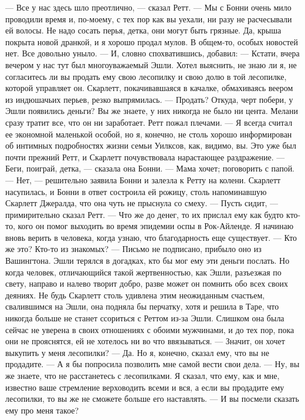 — Все у нас здесь шло преотлично, — сказал Ретт. — Мы с Бонни очень мило проводили время и, по-моему, с тех пор как вы уехали, ни разу не расчесывали ей волосы. Не надо сосать перья, детка, они могут быть грязные. Да, крыша покрыта новой дранкой, и я хорошо продал мулов. В общем-то, особых новостей нет. Все довольно уныло. — И, словно спохватившись, добавил: — Кстати, вчера вечером у нас тут был многоуважаемый Эшли. Хотел выяснить, не знаю ли я, не согласитесь ли вы продать ему свою лесопилку и свою долю в той лесопилке, которой управляет он.
Скарлетт, покачивавшаяся в качалке, обмахиваясь веером из индюшачьих перьев, резко выпрямилась.
— Продать? Откуда, черт побери, у Эшли появились деньги? Вы же знаете, у них никогда не было ни цента. Мелани сразу тратит все, что он ни заработает.
Ретт пожал плечами.
— Я всегда считал ее экономной маленькой особой, но я, конечно, не столь хорошо информирован об интимных подробностях жизни семьи Уилксов, как, видимо, вы.
Это уже был почти прежний Ретт, и Скарлетт почувствовала нарастающее раздражение.
— Беги, поиграй, детка, — сказала она Бонни. — Мама хочет; поговорить с папой.
— Нет, — решительно заявила Бонни и залезла к Ретту на колени.
Скарлетт насупилась, и Бонни в ответ состроила ей рожицу, столь напоминавшую Скарлетт Джералда, что она чуть не прыснула со смеху.
— Пусть сидит, — примирительно сказал Ретт. — Что же до денег, то их прислал ему как будто кто-то, кого он помог выходить во время эпидемии оспы в Рок-Айленде. Я начинаю вновь верить в человека, когда узнаю, что благодарность еще существует.
— Кто же это? Кто-то из знакомых?
— Письмо не подписано, прибыло оно из Вашингтона. Эшли терялся в догадках, кто бы мог ему эти деньги послать. Но когда человек, отличающийся такой жертвенностью, как Эшли, разъезжая по свету, направо и налево творит добро, разве может он помнить обо всех своих деяниях.
Не будь Скарлетт столь удивлена этим неожиданным счастьем, свалившимся на Эшли, она подняла бы перчатку, хотя и решила в Таре, что никогда больше не станет ссориться с Реттом из-за Эшли. Слишком она была сейчас не уверена в своих отношениях с обоими мужчинами, и до тех пор, пока они не прояснятся, ей не хотелось ни во что ввязываться.
— Значит, он хочет выкупить у меня лесопилки?
— Да. Но я, конечно, сказал ему, что вы не продадите.
— А я бы попросила позволить мне самой вести свои дела.
— Ну, вы же знаете, что не расстанетесь с лесопилками. Я сказал, что ему, как и мне, известно ваше стремление верховодить всеми и вся, а если вы продадите ему лесопилки, то вы же не сможете больше его наставлять.
— И вы посмели сказать ему про меня такое?
